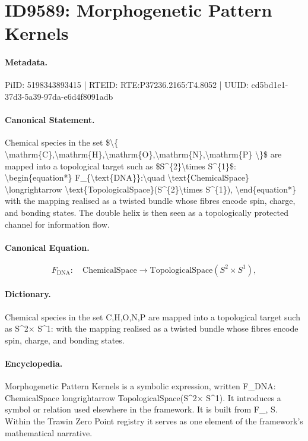 \section*{ID9589: Morphogenetic Pattern Kernels}
\paragraph{Metadata.}
PiID: 5198343893415 | RTEID: RTE:P37236.2165:T4.8052 | UUID: cd5bd1e1-37d3-5a39-97da-e6d4f8091adb

\paragraph{Canonical Statement.}
Chemical species in the set \$\textbackslash{}\{ \textbackslash{}mathrm\{C\},\textbackslash{}mathrm\{H\},\textbackslash{}mathrm\{O\},\textbackslash{}mathrm\{N\},\textbackslash{}mathrm\{P\} \textbackslash{}\}\$ are mapped into a topological target such as \$S\textasciicircum{}\{2\}\textbackslash{}times S\textasciicircum{}\{1\}\$: \textbackslash{}begin\{equation*\} F\_\{\textbackslash{}text\{DNA\}\}:\textbackslash{}quad \textbackslash{}text\{ChemicalSpace\} \textbackslash{}longrightarrow \textbackslash{}text\{TopologicalSpace\}(S\textasciicircum{}\{2\}\textbackslash{}times S\textasciicircum{}\{1\}), \textbackslash{}end\{equation*\} with the mapping realised as a twisted bundle whose fibres encode spin, charge, and bonding states. The double helix is then seen as a topologically protected channel for information flow.

\paragraph{Canonical Equation.}
\[
F_{\text{DNA}}:\quad \text{ChemicalSpace} \longrightarrow \text{TopologicalSpace}(S^{2}\times S^{1}),
\]

\paragraph{Dictionary.}
Chemical species in the set C,H,O,N,P are mapped into a topological target such as S\textasciicircum{}2× S\textasciicircum{}1: with the mapping realised as a twisted bundle whose fibres encode spin, charge, and bonding states.

\paragraph{Encyclopedia.}
Morphogenetic Pattern Kernels is a symbolic expression, written F\_DNA: ChemicalSpace longrightarrow TopologicalSpace(S\textasciicircum{}2× S\textasciicircum{}1). It introduces a symbol or relation used elsewhere in the framework. It is built from F\_, S. Within the Trawin Zero Point registry it serves as one element of the framework's mathematical narrative.
